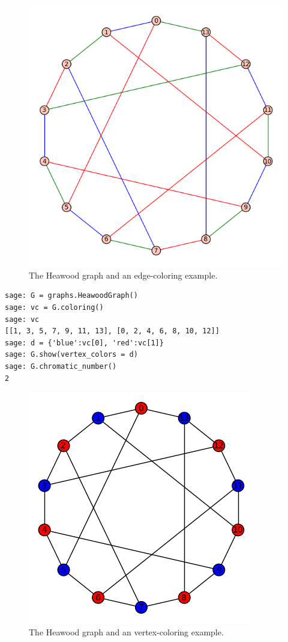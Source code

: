\begin{figure}[!htbp]
\centering
\includegraphics[scale=0.7]{image/graph-coloring/heawood-graph-edge-coloring-example}
\caption{The Heawood graph and an edge-coloring example.}
\label{fig:graph-coloring:heawood-graph-edge-coloring-example}
\end{figure}

\begin{lstlisting}
sage: G = graphs.HeawoodGraph()
sage: vc = G.coloring()
sage: vc
[[1, 3, 5, 7, 9, 11, 13], [0, 2, 4, 6, 8, 10, 12]]
sage: d = {'blue':vc[0], 'red':vc[1]}
sage: G.show(vertex_colors = d)
sage: G.chromatic_number()
2
\end{lstlisting}

\begin{figure}[!htbp]
\centering
{}
\includegraphics[scale=0.7]{image/graph-coloring/heawood-graph-vertex-coloring-example}
\caption{The Heawood graph and an vertex-coloring example.}
\label{fig:graph-coloring:heawood-graph-vertex-coloring-example}
\end{figure}

